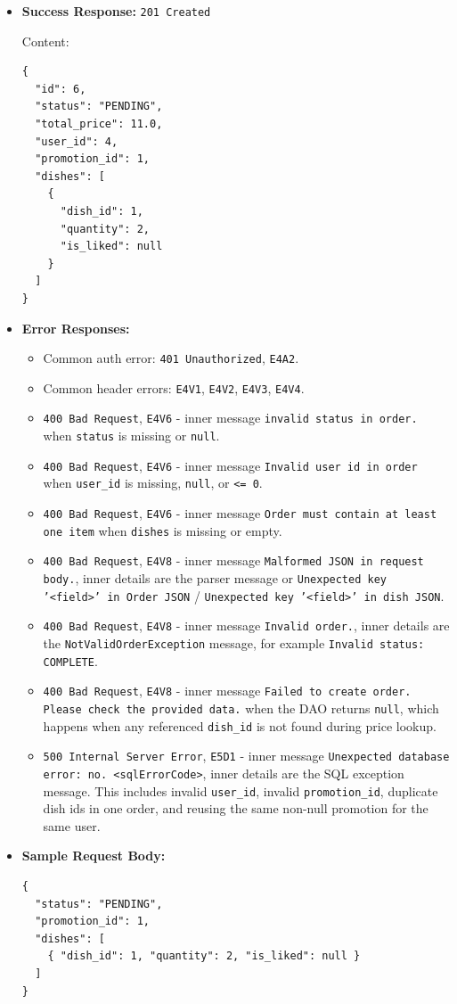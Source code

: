 \begin{itemize}[nosep]
\item \textbf{Success Response:} \texttt{201 Created}

Content:

\begin{lstlisting}
{
  "id": 6,
  "status": "PENDING",
  "total_price": 11.0,
  "user_id": 4,
  "promotion_id": 1,
  "dishes": [
    {
      "dish_id": 1,
      "quantity": 2,
      "is_liked": null
    }
  ]
}
\end{lstlisting}

\item \textbf{Error Responses:}

\begin{itemize}[nosep]
\item Common auth error: \texttt{401 Unauthorized}, \texttt{E4A2}.
\item Common header errors: \texttt{E4V1}, \texttt{E4V2}, \texttt{E4V3}, \texttt{E4V4}.
\item \texttt{400 Bad Request}, \texttt{E4V6} - inner message \texttt{invalid status in order.} when \texttt{status} is missing or \texttt{null}.
\item \texttt{400 Bad Request}, \texttt{E4V6} - inner message \texttt{Invalid user id in order} when \texttt{user\_id} is missing, \texttt{null}, or \texttt{<= 0}.
\item \texttt{400 Bad Request}, \texttt{E4V6} - inner message \texttt{Order must contain at least one item} when \texttt{dishes} is missing or empty.
\item \texttt{400 Bad Request}, \texttt{E4V8} - inner message \texttt{Malformed JSON in request body.}, inner details are the parser message or \texttt{Unexpected key '<field>' in Order JSON} / \texttt{Unexpected key '<field>' in dish JSON}.
\item \texttt{400 Bad Request}, \texttt{E4V8} - inner message \texttt{Invalid order.}, inner details are the \texttt{NotValidOrderException} message, for example \texttt{Invalid status: COMPLETE}.
\item \texttt{400 Bad Request}, \texttt{E4V8} - inner message \texttt{Failed to create order. Please check the provided data.} when the DAO returns \texttt{null}, which happens when any referenced \texttt{dish\_id} is not found during price lookup.
\item \texttt{500 Internal Server Error}, \texttt{E5D1} - inner message \texttt{Unexpected database error: no. <sqlErrorCode>}, inner details are the SQL exception message. This includes invalid \texttt{user\_id}, invalid \texttt{promotion\_id}, duplicate dish ids in one order, and reusing the same non-null promotion for the same user.
\end{itemize}

\item \textbf{Sample Request Body:}

\begin{lstlisting}
{
  "status": "PENDING",
  "promotion_id": 1,
  "dishes": [
    { "dish_id": 1, "quantity": 2, "is_liked": null }
  ]
}
\end{lstlisting}
\end{itemize}

